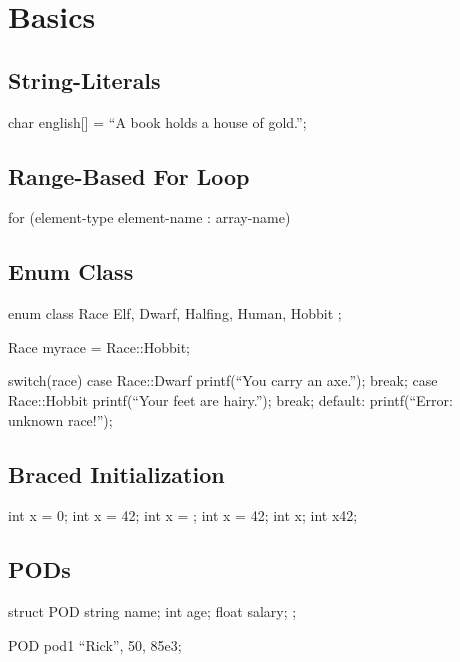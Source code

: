 \documentclass{amsbook}
\begin{document}
\chapter{Basics}

\section{String-Literals}
\begin{cpp}
char english[] = ``A book holds a house of gold.'';
\end{cpp}

\section{Range-Based For Loop}

\begin{cpp}
for (element-type element-name : array-name) {
}
\end{cpp}

\section{Enum Class}

\begin{cpp}
  enum class Race {
    Elf,
    Dwarf,
    Halfing,
    Human,
    Hobbit
 };

  Race myrace = Race::Hobbit;

  switch(race) {
    case Race::Dwarf {
      printf(``You carry an axe.'');
      break;
    }
    case Race::Hobbit {
      printf(``Your feet are hairy.'');
      break;
    }
    default: {
      printf(``Error: unknown race!'');
    }
  }  
\end{cpp}

\section{Braced Initialization}

\begin{cpp}
int x = 0;
int x = 42;
int x = {};
int x = {42};
int x{};
int x{42};
\end{cpp}

\section{PODs}

\begin{cpp}
  struct POD {
    string name;
    int age;
    float salary;
  };

  POD pod1 {``Rick'', 50, 85e3};
  
\end{cpp}
\end{document}
